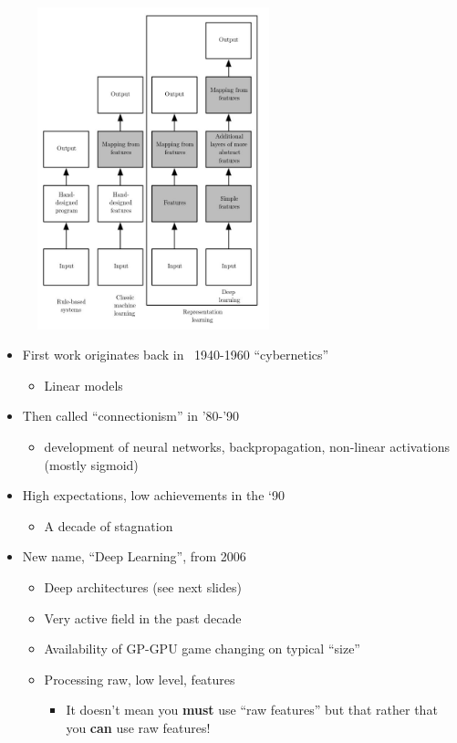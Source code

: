 \begin{figure}
	\includegraphics[width=0.6\textwidth]{figure_ml/history.png}
\end{figure} 

\quad
\begin{itemize}
	\item First work originates back in ~1940-1960 “cybernetics” 
	\begin{itemize}
		\item Linear models
	\end{itemize}
	\item Then called “connectionism” in ’80-’90
	\begin{itemize}
		\item development of neural networks, backpropagation, non-linear activations (mostly sigmoid)
	\end{itemize}
	\item High expectations, low achievements in the ‘90
	\begin{itemize}
		\item A decade of stagnation
	\end{itemize}
	\item New name, “Deep Learning”, from 2006
	\begin{itemize}
		\item Deep architectures (see next slides)
		\item Very active field in the past decade
		\item Availability of GP-GPU game changing on typical “size”
		\item Processing raw, low level, features
		\begin{itemize}
			\item It doesn’t mean you \textbf{must} use “raw features” but that rather that you \textbf{can} use raw features!
		\end{itemize}
	\end{itemize}
\end{itemize}

